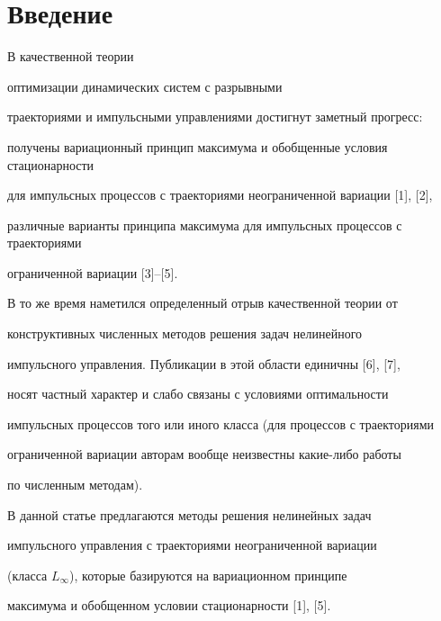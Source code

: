 \maketitle


\label{begin}








\section{Введение}





В качественной теории 


оптимизации динамических систем с разрывными


траекториями и импульсными управлениями достигнут заметный прогресс: 


получены вариационный принцип максимума и обобщенные условия стационарности


для импульсных процессов с траекториями неограниченной вариации [1], [2],


различные варианты принципа максимума для импульсных процессов с траекториями 


ограниченной вариации [3]--[5].


В то же время наметился определенный отрыв качественной теории от 


конструктивных численных методов решения  задач нелинейного


импульсного управления. Публикации в этой области единичны [6], [7], 


носят частный характер и слабо связаны с условиями оптимальности 


импульсных процессов того или иного класса (для процессов с траекториями


ограниченной вариации авторам вообще неизвестны какие-либо работы


по численным методам).





В данной статье предлагаются методы решения нелинейных задач


импульсного управления с траекториями неограниченной вариации


(класса $L_\infty$), которые базируются на вариационном принципе 


максимума и обобщенном условии стационарности [1], [5]. 


